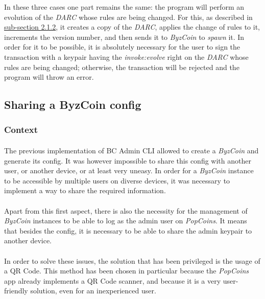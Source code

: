 In these three cases one part remains the same: the program will perform an evolution of the \textit{DARC} whose rules are being changed. For this, as described in \hyperref[subsection212]{sub-section 2.1.2}, it creates a copy of the \textit{DARC}, applies the change of rules to it, increments the version number, and then sends it to \textit{ByzCoin} to \textit{spawn} it. In order for it to be possible, it is absolutely necessary for the user to sign the transaction with a keypair having the \textit{invoke:evolve} right on the \textit{DARC} whose rules are being changed; otherwise, the transaction will be rejected and the program will throw an error.

\subsection{Sharing a ByzCoin config}

\subsubsection{Context}

\paragraph{}

The previous implementation of BC Admin CLI allowed to create a \textit{ByzCoin} and generate its config. It was however impossible to share this config with another user, or another device, or at least very uneasy. In order for a \textit{ByzCoin} instance to be accessible by multiple users on diverse devices, it was necessary to implement a way to share the required information.

\paragraph{}

Apart from this first aspect, there is also the necessity for the management of \textit{ByzCoin} instances to be able to log as the admin user on \textit{PopCoins}. It means that besides the config, it is necessary to be able to share the admin keypair to another device.

\paragraph{}

In order to solve these issues, the solution that has been privileged is the usage of a QR Code. This method has been chosen in particular because the \textit{PopCoins} app already implements a QR Code scanner, and because it is a very user-friendly solution, even for an inexperienced user.

